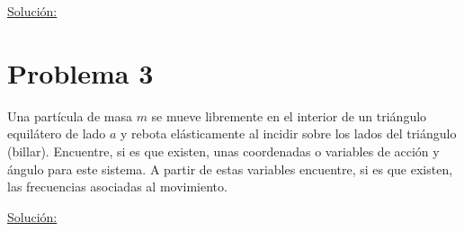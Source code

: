 \documentclass[a4paper,10pt]{article}
\numberwithin{equation}{section}
\begin{document}
\vspace{.3cm}

\underline{Solución:} \vspace{.3cm}

\section{Problema 3}

Una partícula de masa $m$ se mueve libremente en el interior de un triángulo  
equilátero de lado $a$ y rebota elásticamente al incidir sobre los lados del triángulo 
(billar). Encuentre, si es que existen, unas coordenadas o variables de acción 
y ángulo para este sistema. A partir de estas variables encuentre, si es que existen,
las frecuencias asociadas al movimiento. 

\vspace{.3cm}

\underline{Solución:} \vspace{.3cm}
\end{document}
